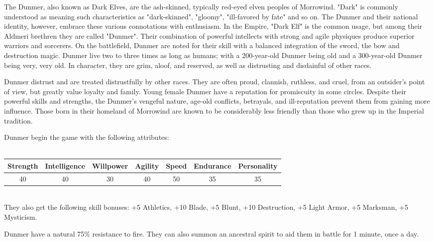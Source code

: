 \documentclass[12pt]{book}
\begin{document}
The Dunmer, also known as Dark Elves, are the ash-skinned, typically red-eyed elven peoples of Morrowind. "Dark" is commonly understood as meaning such characteristics as "dark-skinned", "gloomy", "ill-favored by fate" and so on. The Dunmer and their national identity, however, embrace these various connotations with enthusiasm. In the Empire, "Dark Elf" is the common usage, but among their Aldmeri brethren they are called "Dunmer". Their combination of powerful intellects with strong and agile physiques produce superior warriors and sorcerers. On the battlefield, Dunmer are noted for their skill with a balanced integration of the sword, the bow and destruction magic. Dunmer live two to three times as long as humans; with a 200-year-old Dunmer being old and a 300-year-old Dunmer being very, very old. In character, they are grim, aloof, and reserved, as well as distrusting and disdainful of other races.

Dunmer distrust and are treated distrustfully by other races. They are often proud, clannish, ruthless, and cruel, from an outsider's point of view, but greatly value loyalty and family. Young female Dunmer have a reputation for promiscuity in some circles. Despite their powerful skills and strengths, the Dunmer's vengeful nature, age-old conflicts, betrayals, and ill-reputation prevent them from gaining more influence. Those born in their homeland of Morrowind are known to be considerably less friendly than those who grew up in the Imperial tradition.

Dunmer begin the game with the following attributes:\\~\\
\begin{tabular}{|c|c|c|c|c|c|c|}
\hline
Strength & Intelligence & Willpower & Agility & Speed & Endurance & Personality\\ \hline
40 & 40 & 30 & 40 & 50 & 35 & 35\\ \hline

\end{tabular}\\

They also get the following skill bonuses: +5 Athletics, +10 Blade, +5 Blunt, +10 Destruction, +5 Light Armor, +5 Marksman, +5 Mysticism.

Dunmer have a natural 75\% resistance to fire. They can also summon an ancestral spirit to aid them in battle for 1 minute, once a day.\\
\end{document}
